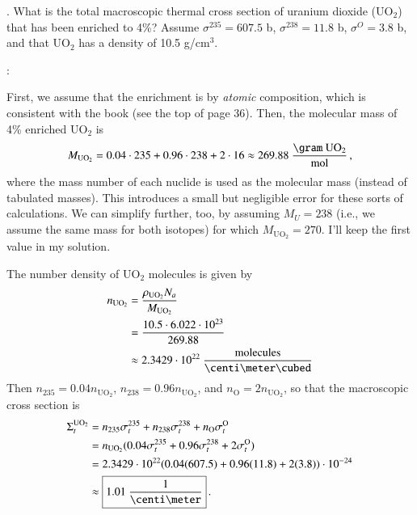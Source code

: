 .
What is the total macroscopic thermal cross section of uranium dioxide (UO$_2$) that has been enriched to 4\%?  Assume $\sigma^{235} = 607.5$ b, $\sigma^{238} = 11.8$ b, $\sigma^{O} = 3.8$ b, and that UO$_2$ has a density of 10.5 g/cm$^3$.


\vspace{0.5cm}
\ifsolved
{
\color{purple}

:

First, we assume that the enrichment is by {\it atomic} composition, which is consistent with the book (see the top of page 36).  Then, the molecular mass of 4\% enriched UO$_2$ is
\begin{equation*}
 M_{\text{UO}_2} = 0.04\cdot 235 + 0.96\cdot 238 + 2\cdot 16 \approx 269.88~\frac{\gram~\text{UO}_2}{\text{mol}} \, ,
\end{equation*}
where the mass number of each nuclide is used as the molecular mass (instead of tabulated masses).  This introduces a small but negligible error for these sorts of calculations.  We can simplify further, too, by assuming $M_U = 238$ (i.e., we assume the same mass for both isotopes) for which $M_{\text{UO}_2} = 270$.  I'll keep the first value in my solution.

The number density of UO$_2$ molecules is given by
\begin{align*}
  n_{\text{UO}_2} &= \frac{\rho_{\text{UO}_2} N_a}{M_{\text{UO}_2}} \\
                   &= \frac{10.5 \cdot 6.022\cdot 10^{23}}
                           {269.88} \\
    &\approx 2.3429\cdot 10^{22}~\frac{\text{molecules}}{\centi\meter\cubed}
\end{align*}
Then $n_{235} = 0.04 n_{\text{UO}_2}$, $n_{238} = 0.96 n_{\text{UO}_2}$, and $n_{\text{O}}=2 n_{\text{UO}_2}$, so that the macroscopic cross section is
\begin{align*}
 \Sigma^{\text{UO}_2}_t
  &= n_{235} \sigma_t^{235} + n_{238} \sigma_t^{238} + n_{\text{O}} \sigma_t^{\text{O}} \\
  &= n_{\text{UO}_2} ( 0.04 \sigma_t^{235} + 0.96 \sigma_t^{238} + 2 \sigma_t^{\text{O}}) \\
  &= 2.3429\cdot 10^{22} ( 0.04(607.5) + 0.96(11.8) + 2(3.8) )\cdot 10^{-24} \\
  &\approx \boxed{1.01~\frac{1}{\centi\meter}} \, .
\end{align*}




} %
\newpage
\else
\fi
